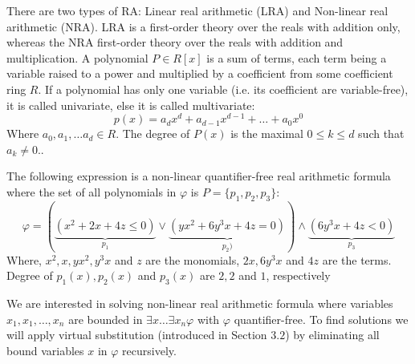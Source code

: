 There are two types of RA: Linear real arithmetic (LRA) and Non-linear real arithmetic (NRA). LRA is a first-order theory over the reals with addition only, whereas the NRA first-order theory over the reals with addition and multiplication.\newline
A polynomial $P\in R[x]$ is a sum of terms, each term being a variable raised to a power and multiplied by a coefficient from some coefficient ring $R$. If a polynomial has only one variable (i.e. its coefficient are variable-free), it is called univariate, else it is called multivariate: 
$$ p(x) = a_{d}x^{d} + a_{d-1}x^{d-1} + \ldots + a_{0}x^{0} $$
Where $a_{0}, a_{1},\ldots a_{d}\in R$.\newline
The degree of $P(x)$ is the maximal $0\leq k\leq d$ such that $a_{k}\neq 0$.\newline.
\begin{example}
	The following expression is a non-linear quantifier-free real arithmetic formula where the set of all polynomials in $\varphi$ is $P=\{p_{1}, p_{2}, p_{3}\}$:
	$$\varphi = (\underbrace{(x^{2}+2x+4z\leq 0)}\limits_{p_{1}}\vee \underbrace{(yx^{2}+6y^{3}x+4z= 0)}\limits_{p_{2})}) \wedge \underbrace{(6y^{3}x+4z< 0)}\limits_{p_{3}} $$
	Where, $x^{2}, x, yx^{2}, y^{3}x$ and $z$ are the monomials, $2x, 6y^{3}x$ and $4z$ are the terms. Degree of $p_{1}(x), p_{2}(x)$ and $p_{3}(x)$ are $2, 2$ and $1$, respectively
\end{example} 
We are interested in solving non-linear real arithmetic formula where variables $x_{1},x_{1},\ldots,x_{n}$ are bounded in $\exists x\ldots\exists x_{n}\varphi$ with $\varphi$ quantifier-free. To find solutions we will apply virtual substitution (introduced in Section $3.2$) by eliminating all bound variables $x$ in $\varphi$ recursively.
